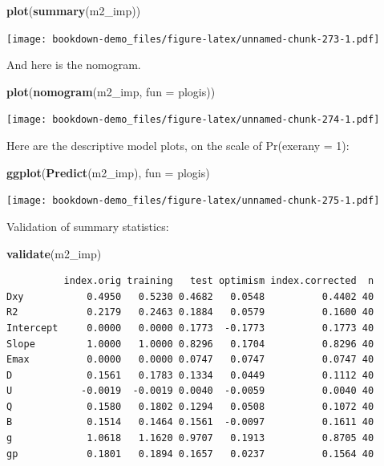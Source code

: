 \documentclass[]{book}
\newenvironment{Shaded}{\begin{snugshade}}{\end{snugshade}}
\newcommand{\KeywordTok}[1]{\textcolor[rgb]{0.13,0.29,0.53}{\textbf{#1}}}
\newcommand{\DataTypeTok}[1]{\textcolor[rgb]{0.13,0.29,0.53}{#1}}
\newcommand{\NormalTok}[1]{#1}
\theoremstyle{definition}
\theoremstyle{definition}
\theoremstyle{definition}
\theoremstyle{remark}
\begin{document}
\begin{Shaded}
\begin{Highlighting}[]
\KeywordTok{plot}\NormalTok{(}\KeywordTok{summary}\NormalTok{(m2_imp))}
\end{Highlighting}
\end{Shaded}

\texttt{[image: bookdown-demo\_files/figure-latex/unnamed-chunk-273-1.pdf]}

And here is the nomogram.

\begin{Shaded}
\begin{Highlighting}[]
\KeywordTok{plot}\NormalTok{(}\KeywordTok{nomogram}\NormalTok{(m2_imp, }\DataTypeTok{fun =}\NormalTok{ plogis))}
\end{Highlighting}
\end{Shaded}

\texttt{[image: bookdown-demo\_files/figure-latex/unnamed-chunk-274-1.pdf]}

Here are the descriptive model plots, on the scale of Pr(exerany = 1):

\begin{Shaded}
\begin{Highlighting}[]
\KeywordTok{ggplot}\NormalTok{(}\KeywordTok{Predict}\NormalTok{(m2_imp), }\DataTypeTok{fun =}\NormalTok{ plogis)}
\end{Highlighting}
\end{Shaded}

\texttt{[image: bookdown-demo\_files/figure-latex/unnamed-chunk-275-1.pdf]}

Validation of summary statistics:

\begin{Shaded}
\begin{Highlighting}[]
\KeywordTok{validate}\NormalTok{(m2_imp)}
\end{Highlighting}
\end{Shaded}

\begin{verbatim}
          index.orig training   test optimism index.corrected  n
Dxy           0.4950   0.5230 0.4682   0.0548          0.4402 40
R2            0.2179   0.2463 0.1884   0.0579          0.1600 40
Intercept     0.0000   0.0000 0.1773  -0.1773          0.1773 40
Slope         1.0000   1.0000 0.8296   0.1704          0.8296 40
Emax          0.0000   0.0000 0.0747   0.0747          0.0747 40
D             0.1561   0.1783 0.1334   0.0449          0.1112 40
U            -0.0019  -0.0019 0.0040  -0.0059          0.0040 40
Q             0.1580   0.1802 0.1294   0.0508          0.1072 40
B             0.1514   0.1464 0.1561  -0.0097          0.1611 40
g             1.0618   1.1620 0.9707   0.1913          0.8705 40
gp            0.1801   0.1894 0.1657   0.0237          0.1564 40
\end{verbatim}
\end{document}
